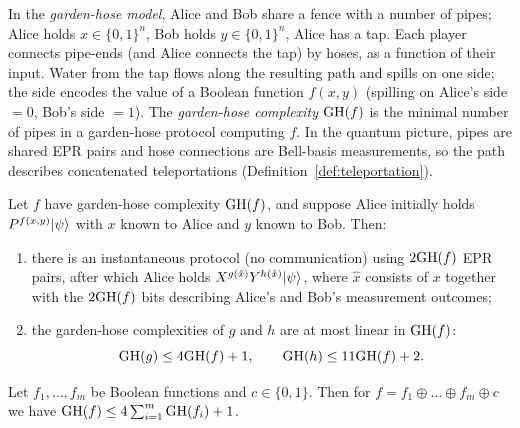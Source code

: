 \begin{definition}
  \label{def:garden-hose}
  In the \emph{garden-hose model}, Alice and Bob share a fence with a number of
  pipes; Alice holds $x\in\{0,1\}^n$, Bob holds $y\in\{0,1\}^n$, Alice has a tap.
  Each player connects pipe-ends (and Alice connects the tap) by hoses, as a
  function of their input. Water from the tap flows along the resulting path and
  spills on one side; the side encodes the value of a Boolean function $f(x,y)$
  (spilling on Alice's side $=0$, Bob's side $=1$). The \emph{garden-hose
  complexity} $\mathrm{GH}(f)$ is the minimal number of pipes in a garden-hose protocol
  computing $f$. In the quantum picture, pipes are shared EPR pairs and hose
  connections are Bell-basis measurements, so the path describes concatenated
  teleportations (Definition~\ref{def:teleportation}).
\end{definition}

\begin{lemma}
  \label{lem:gh-instantaneous}
  \notready
  Let $f$ have garden-hose complexity $\mathrm{GH}(f)$, and suppose Alice initially holds
  $P^{f(x,y)}\lvert \psi\rangle$ with $x$ known to Alice and $y$ known to Bob. Then:
  \begin{enumerate}
    \item there is an instantaneous protocol (no communication) using $2\mathrm{GH}(f)$
      EPR pairs, after which Alice holds $X^{g(\hat x)} Y^{h(\hat x)}\lvert \psi\rangle$,
      where $\hat x$ consists of $x$ together with the $2\mathrm{GH}(f)$ bits describing
      Alice's and Bob's measurement outcomes;
    \item the garden-hose complexities of $g$ and $h$ are at most linear in
      $\mathrm{GH}(f)$:
      \[
        \mathrm{GH}(g) \le 4\mathrm{GH}(f) + 1, \qquad \mathrm{GH}(h) \le 11\mathrm{GH}(f) + 2.
      \]
  \end{enumerate}
\end{lemma}

\begin{lemma}
  \label{lem:gh-xor}
  \notready
  Let $f_1,\dots,f_m$ be Boolean functions and $c\in\{0,1\}$. Then for $f =
  f_1\oplus\dots\oplus f_m\oplus c$ we have $\mathrm{GH}(f) \le 4\sum_{i=1}^m \mathrm{GH}(f_i) +
  1$.
\end{lemma}

